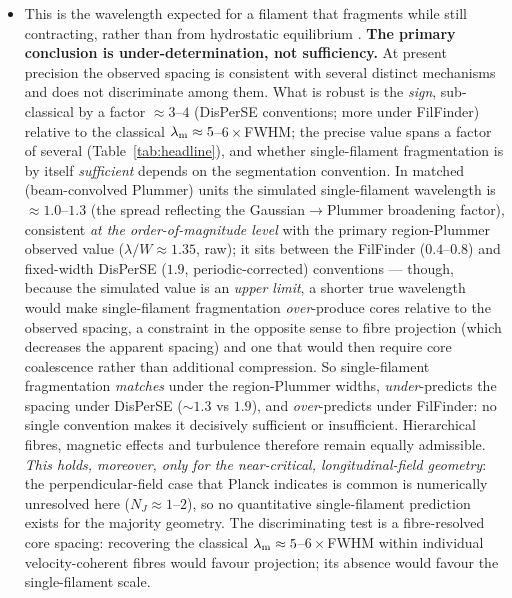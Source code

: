 \documentclass[usenatbib,twoside,twocolumn]{mnras}
\begin{document}
\begin{itemize}
\begin{itemize}
        \item This is the wavelength expected for a filament that fragments while still contracting, rather than from hydrostatic equilibrium \citep{Clarke2016}. \textbf{The primary conclusion is under-determination, not sufficiency.} At present precision the observed spacing is consistent with several distinct mechanisms and does not discriminate among them. What is robust is the \emph{sign}, sub-classical by a factor $\approx3$--$4$ (DisPerSE conventions; more under FilFinder) relative to the classical $\lambda_{\rm m}\approx5$--$6\times$FWHM; the precise value spans a factor of several (Table~\ref{tab:headline}), and whether single-filament fragmentation is by itself \emph{sufficient} depends on the segmentation convention. In matched (beam-convolved Plummer) units the simulated single-filament wavelength is $\approx1.0$--$1.3$ (the spread reflecting the Gaussian$\to$Plummer broadening factor), consistent \emph{at the order-of-magnitude level} with the primary region-Plummer observed value ($\lambda/W\approx1.35$, raw); it sits between the FilFinder ($0.4$--$0.8$) and fixed-width DisPerSE ($1.9$, periodic-corrected) conventions --- though, because the simulated value is an \emph{upper limit}, a shorter true wavelength would make single-filament fragmentation \emph{over}-produce cores relative to the observed spacing, a constraint in the opposite sense to fibre projection (which decreases the apparent spacing) and one that would then require core coalescence rather than additional compression. So single-filament fragmentation \emph{matches} under the region-Plummer widths, \emph{under}-predicts the spacing under DisPerSE ($\sim1.3$ vs $1.9$), and \emph{over}-predicts under FilFinder: no single convention makes it decisively sufficient or insufficient. Hierarchical fibres, magnetic effects and turbulence therefore remain equally admissible. \emph{This holds, moreover, only for the near-critical, longitudinal-field geometry}: the perpendicular-field case that Planck indicates is common is numerically unresolved here ($N_J\approx1$--$2$), so no quantitative single-filament prediction exists for the majority geometry. The discriminating test is a fibre-resolved core spacing: recovering the classical $\lambda_{\rm m}\approx5$--$6\times$FWHM within individual velocity-coherent fibres would favour projection; its absence would favour the single-filament scale.
    \end{itemize}


\end{itemize}
\end{document}
